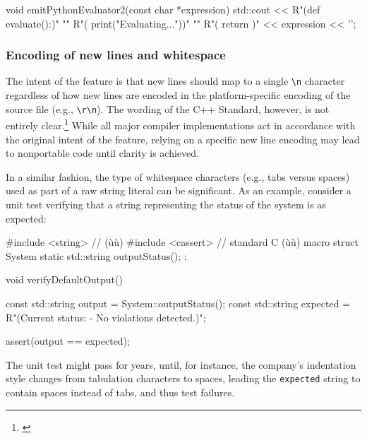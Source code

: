 \begin{emcppslisting}[emcppsbatch=e4]
void emitPythonEvaluator2(const char *expression)
{
    std::cout <<
        R"(def evaluate():)"                 "\n"
        R"(    print("Evaluating..."))"      "\n"
        R"(    return )" << expression << '\n';
}
\end{emcppslisting}
    

\subsubsection[Encoding of new lines and whitespace]{Encoding of new lines and whitespace}\label{encoding-of-newlines-and-whitespace}

The intent of the feature is that new lines should map to a single
\lstinline!\n! character regardless of how new lines are encoded
in the platform-specific encoding of the source file (e.g., \lstinline!\r\n!). The wording of the C++ Standard, however, is not
entirely clear.\footnote{\cite{miller13}} While all major compiler
implementations act in accordance with the original intent of the
feature, relying on a specific new line encoding may lead to nonportable
code until clarity is achieved.

In a similar fashion, the type of whitespace characters (e.g., tabs
versus spaces) used as part of a raw string literal can be significant.
As an example, consider a unit test verifying that a string representing
the status of the system is as expected:

\newpage%
\begin{emcppshiddenlisting}[emcppsbatch=e5]
#include <string>   // (ù{}ù)
#include <cassert>  // standard C (ù{}ù) macro
struct System
{
    static std::string outputStatus();
};
\end{emcppshiddenlisting}
\begin{emcppslisting}[emcppsbatch=e5]
void verifyDefaultOutput()
{
    const std::string output = System::outputStatus();
    const std::string expected = R"(Current status:
    - No violations detected.)";

    assert(output == expected);
}
\end{emcppslisting}
    
\noindent The unit test might pass for years, until, for instance, the
company's indentation style changes from tabulation characters to
spaces, leading the \lstinline!expected! string to contain spaces instead of tabs, and thus test failures.

